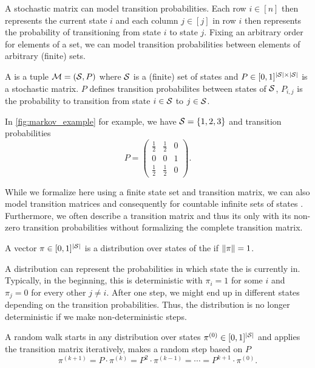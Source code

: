 \noindent A stochastic matrix can model transition probabilities.
Each row $i \in [n]$ then represents the current state $i$ and each column $j \in [j]$ in row $i$ then represents the probability of transitioning from state $i$ to state $j$.
Fixing an arbitrary order for elements of a set, we can model transition probabilities between elements of arbitrary (finite) sets.

\begin{definition}
  A \markov is a tuple $\mathcal{M} = (\mathcal{S}, P)$ where $\mathcal{S}$ is a (finite) set of states and $P \in [0, 1]^{|\mathcal{S}| \times |\mathcal{S}|}$ is a stochastic matrix.
  $P$ defines transition probabilites between states of $\mathcal{S}$, \ie $P_{i, j}$ is the probability to transition from state $i \in \mathcal{S}$ to $j \in \mathcal{S}$.
\end{definition}

\noindent In \cref{fig:markov_example} for example, we have $\mathcal{S} = \left\{1, 2, 3\right\}$ and transition probabilities \[
  P = \left(\begin{array}{ccc}
    \frac{1}{2} & \frac{1}{2} & 0 \\
    0 & 0 & 1 \\
    \frac{1}{2} & \frac{1}{2} & 0 
  \end{array}\right).
\]

\noindent While we formalize \markovs here using a finite state set and transition matrix, we can also model transition matrices and consequently \markovs for countable infinite sets of states \states.
Furthermore, we often describe a transition matrix and thus its \markov only with its non-zero transition probabilities without formalizing the complete transition matrix.

\begin{definition}[Distribution]
  A vector $\pi \in [0, 1]^{|\mathcal{S}|}$ is a distribution over states of the \markov if $\left\lVert\pi\right\rVert = 1$.
\end{definition}

\noindent A distribution can represent the probabilities in which state the \markov is currently in.
Typically, in the beginning, this is deterministic with $\pi_i = 1$ for some $i$ and $\pi_j = 0$ for every other $j \neq i$.
After one step, we might end up in different states depending on the transition probabilities.
Thus, the distribution is no longer deterministic if we make non-deterministic steps.

\begin{definition}
  A random walk starts in any distribution over states $\pi^{(0)} \in [0, 1]^{|\mathcal{S}|}$ and applies the transition matrix iteratively, \ie makes a random step based on $P$ \[
    \pi^{(k + 1)} = P \cdot \pi^{(k)} = P^2 \cdot \pi^{(k - 1)} = \cdots = P^{k + 1} \cdot \pi^{(0)}.
  \]
\end{definition}

